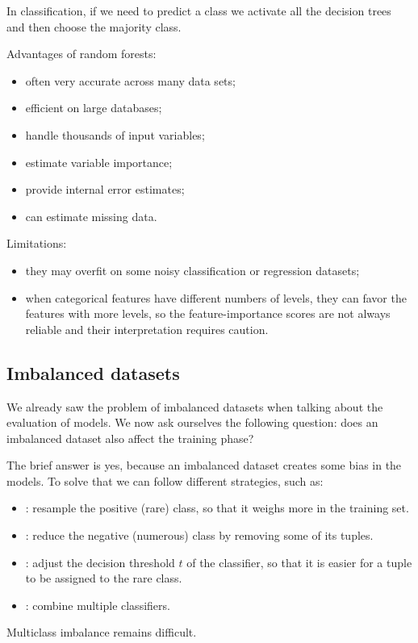In classification, if we need to predict a class we activate all the decision trees and then choose the majority class.

Advantages of random forests:
\begin{itemize}
  \item often very accurate across many data sets;
  \item efficient on large databases;
  \item handle thousands of input variables;
  \item estimate variable importance;
  \item provide internal error estimates;
  \item can estimate missing data.
\end{itemize}

Limitations:
\begin{itemize}
  \item they may overfit on some noisy classification or regression datasets;
  \item when categorical features have different numbers of levels, they can favor the features with more levels, so the feature-importance scores are not always reliable and their interpretation requires caution.
\end{itemize}

\subsection{Imbalanced datasets}

We already saw the problem of imbalanced datasets when talking about the evaluation of models. We now ask ourselves the following question: does an imbalanced dataset also affect the training phase?

The brief answer is yes, because an imbalanced dataset creates some bias in the models. To solve that we can follow different strategies, such as:
\begin{itemize}
  \item {}: resample the positive (rare) class, so that it weighs more in the training set.
  \item {}: reduce the negative (numerous) class by removing some of its tuples.
  \item {}: adjust the decision threshold $t$ of the classifier, so that it is easier for a tuple to be assigned to the rare class.
  \item {}: combine multiple classifiers.
\end{itemize}
Multiclass imbalance remains difficult.

